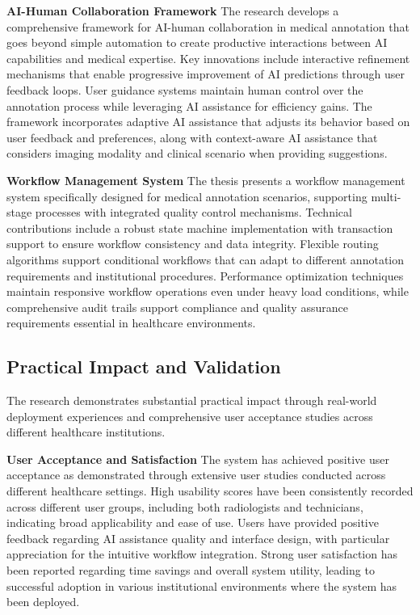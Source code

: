 \textbf{AI-Human Collaboration Framework}
The research develops a comprehensive framework for AI-human collaboration in medical annotation that goes beyond simple automation to create productive interactions between AI capabilities and medical expertise. Key innovations include interactive refinement mechanisms that enable progressive improvement of AI predictions through user feedback loops. User guidance systems maintain human control over the annotation process while leveraging AI assistance for efficiency gains. The framework incorporates adaptive AI assistance that adjusts its behavior based on user feedback and preferences, along with context-aware AI assistance that considers imaging modality and clinical scenario when providing suggestions.

\textbf{Workflow Management System}
The thesis presents a workflow management system specifically designed for medical annotation scenarios, supporting multi-stage processes with integrated quality control mechanisms. Technical contributions include a robust state machine implementation with transaction support to ensure workflow consistency and data integrity. Flexible routing algorithms support conditional workflows that can adapt to different annotation requirements and institutional procedures. Performance optimization techniques maintain responsive workflow operations even under heavy load conditions, while comprehensive audit trails support compliance and quality assurance requirements essential in healthcare environments.

\subsection{Practical Impact and Validation}

The research demonstrates substantial practical impact through real-world deployment experiences and comprehensive user acceptance studies across different healthcare institutions.

\textbf{User Acceptance and Satisfaction}
The system has achieved positive user acceptance as demonstrated through extensive user studies conducted across different healthcare settings. High usability scores have been consistently recorded across different user groups, including both radiologists and technicians, indicating broad applicability and ease of use. Users have provided positive feedback regarding AI assistance quality and interface design, with particular appreciation for the intuitive workflow integration. Strong user satisfaction has been reported regarding time savings and overall system utility, leading to successful adoption in various institutional environments where the system has been deployed.

